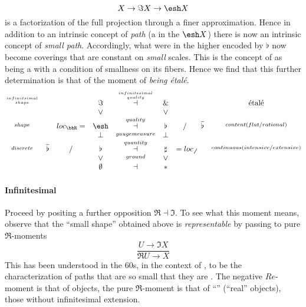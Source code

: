 \documentclass[12pt,titlepage]{article}
\newcommand{\itexarray}[1]{\begin{matrix}#1\end{matrix}}
\theoremstyle{plain}
\theoremstyle{definition}
\theoremstyle{remark}
\begin{document}
\begin{displaymath}
X \to \Im X \to \esh  X
\end{displaymath}
is a factorization of the full  projection through a finer approximation. Hence in addition to an intrinsic concept of \emph{path} (a  in the  $\esh  X$) there is now an intrinsic concept of \emph{small path}.
Accordingly, what were  in the higher  encoded by $\flat$ now become coverings that are constant on \emph{small} scales. This is the concept of  as being a  with a condition of smallness on its fibers.
Hence we find that this further determination is that of the moment of \emph{being étalé}.
\begin{displaymath}
\itexarray{
\stackrel{infinitsimal \atop shape}{} && & \Im &\stackrel{infinitesimal \atop quality}{\dashv}& \& & && \text{étalé}
\\
&& & \vee && \vee
\\
\stackrel{shape}{} && loc_{\bbR} = & \esh  &\stackrel{quality}{\dashv}& \flat & / & \overline{\flat}&  \stackrel{content(flat/rational)}{}
\\
&& & \bot &\stackrel{gaugemeasure}{}& \bot
\\
\stackrel{discrete}{} &\overline{\flat}& / & \flat &\stackrel{quantity}{\dashv}& \sharp & = loc_{\not\not}  &   & \stackrel{continuous (intensive/extensive)}{}
\\
&& & \vee &\stackrel{ground}{}& \vee
\\
&& & \emptyset &\dashv& \ast &
}
\end{displaymath}
\hypertarget{infinitesimal}{}\paragraph*{{Infinitesimal}}\label{infinitesimal}
Proceed by positing a further opposition $\Re \dashv \Im$.
To see what this moment means, observe that the ``small shape'' obtained above is \emph{representable} by passing to pure $\Re$-moments
\begin{displaymath}
\frac{U \to \Im X}{\Re U \to X}
\end{displaymath}
This has been understood in the 60s, in the context of , to be the characterization of paths that are so small that they are . The negative $Re$-moment is that of  objects, the pure $\Re$-moment is that of ``'' (``real'' objects), those without infinitesimal extension.
\end{document}
